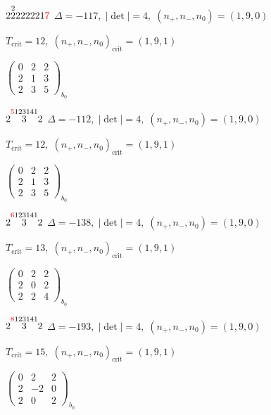\documentclass[10pt]{article}
\begin{document}
$2\overset{2}{2}222221\textcolor{red}{7}$ \quad $\Delta=-117,\; |\det|=4,\; (n_+,n_-,n_0)=(1,9,0)$

\hspace{1em}$T_{\text{crit}}=12,\; (n_+,n_-,n_0)_{\text{crit}}=(1,9,1)$

\hspace{2em}$\left(\begin{smallmatrix}0 & 2 & 2 \\ 2 & 1 & 3 \\ 2 & 3 & 5\end{smallmatrix}\right)_{\!b_0}$

\smallskip

$2\overset{\textcolor{red}{5}123141}{3}2$ \quad $\Delta=-112,\; |\det|=4,\; (n_+,n_-,n_0)=(1,9,0)$

\hspace{1em}$T_{\text{crit}}=12,\; (n_+,n_-,n_0)_{\text{crit}}=(1,9,1)$

\hspace{2em}$\left(\begin{smallmatrix}0 & 2 & 2 \\ 2 & 1 & 3 \\ 2 & 3 & 5\end{smallmatrix}\right)_{\!b_0}$

$2\overset{\textcolor{red}{6}123141}{3}2$ \quad $\Delta=-138,\; |\det|=4,\; (n_+,n_-,n_0)=(1,9,0)$

\hspace{1em}$T_{\text{crit}}=13,\; (n_+,n_-,n_0)_{\text{crit}}=(1,9,1)$

\hspace{2em}$\left(\begin{smallmatrix}0 & 2 & 2 \\ 2 & 0 & 2 \\ 2 & 2 & 4\end{smallmatrix}\right)_{\!b_0}$

$2\overset{\textcolor{red}{8}123141}{3}2$ \quad $\Delta=-193,\; |\det|=4,\; (n_+,n_-,n_0)=(1,9,0)$

\hspace{1em}$T_{\text{crit}}=15,\; (n_+,n_-,n_0)_{\text{crit}}=(1,9,1)$

\hspace{2em}$\left(\begin{smallmatrix}0 & 2 & 2 \\ 2 & -2 & 0 \\ 2 & 0 & 2\end{smallmatrix}\right)_{\!b_0}$
\end{document}
